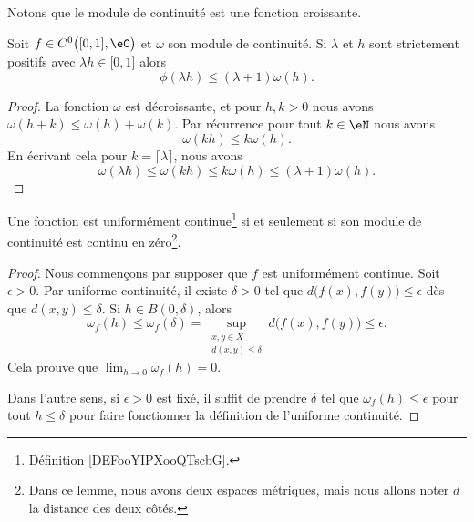 Notons que le module de continuité est une fonction croissante.

\begin{lemma}   \label{LemLUbgYeo}
    Soit \( f\in C^0\big( \mathopen[ 0 , 1 \mathclose],\eC \big)\) et \( \omega\) son module de continuité. Si \( \lambda\) et \( h\) sont strictement positifs avec \( \lambda h\in\mathopen[ 0 , 1 \mathclose]\) alors
    \begin{equation}
        \phi(\lambda h)\leq (\lambda+1)\omega(h).
    \end{equation}
\end{lemma}

\begin{proof}
    La fonction \( \omega\) est décroissante, et pour \( h,k>0\) nous avons \( \omega(h+k)\leq\omega(h)+\omega(k)\). Par récurrence pour tout \( k\in \eN\) nous avons
    \begin{equation}
        \omega(kh)\leq k\omega(h).
    \end{equation}
    En écrivant cela pour \( k=\lceil \lambda\rceil\), nous avons
    \begin{equation}
        \omega(\lambda h)\leq \omega(kh)\leq k\omega(h)\leq (\lambda+1)\omega(h).
    \end{equation}
\end{proof}

\begin{lemma}   \label{LemeERapq}
    Une fonction est uniformément continue\footnote{Définition \ref{DEFooYIPXooQTscbG}.} si et seulement si son module de continuité est continu en zéro\footnote{Dans ce lemme, nous avons deux espaces métriques, mais nous allons noter \( d\) la distance des deux côtés.}.
\end{lemma}

\begin{proof}
    Nous commençons par supposer que \( f\) est uniformément continue. Soit \( \epsilon>0\). Par uniforme continuité, il existe \( \delta>0\) tel que \( d\big( f(x),f(y) \big)\leq \epsilon\) dès que \( d(x,y)\leq \delta\). Si \( h\in B(0,\delta)\), alors
    \begin{equation}
        \omega_f(h)\leq \omega_f(\delta)=\sup_{\substack{x,y\in X\\d(x,y)\leq \delta}}d\big( f(x),f(y) \big)\leq \epsilon.
    \end{equation}
    Cela prouve que \( \lim_{h\to 0} \omega_f(h)=0\).

    Dans l'autre sens, si \( \epsilon>0\) est fixé, il suffit de prendre \( \delta\) tel que \( \omega_f(h)\leq \epsilon\) pour tout \( h\leq \delta\) pour faire fonctionner la définition de l'uniforme continuité.
\end{proof}

